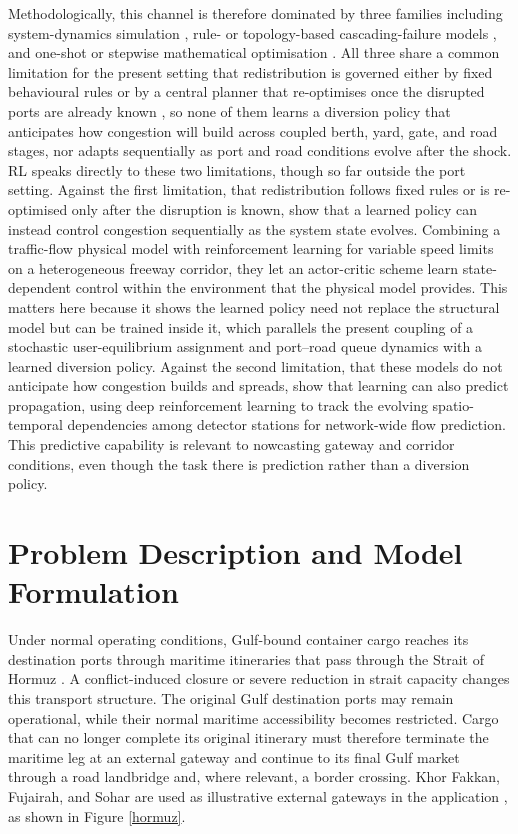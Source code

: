 \documentclass[a4paper,fleqn]{cas-sc}
\begin{document}
Methodologically, this channel is therefore dominated by three families including system-dynamics simulation \citep{BellEtAl2023}, rule- or topology-based cascading-failure models \citep{XuEtAl2022,XuEtAl2025,LuEtAl2024}, and one-shot or stepwise mathematical optimisation \citep{CaoEtAl2025}. All three share a common limitation for the present setting that redistribution is governed either by fixed behavioural rules \citep{XuEtAl2022,XuEtAl2025} or by a central planner that re-optimises once the disrupted ports are already known \citep{LuEtAl2024,CaoEtAl2025}, so none of them learns a diversion policy that anticipates how congestion will build across coupled berth, yard, gate, and road stages, nor adapts sequentially as port and road conditions evolve after the shock. RL speaks directly to these two limitations, though so far outside the port setting. Against the first limitation, that redistribution follows fixed rules or is re-optimised only after the disruption is known, \citet{yang2026optimal} show that a learned policy can instead control congestion sequentially as the system state evolves. Combining a traffic-flow physical model with reinforcement learning for variable speed limits on a heterogeneous freeway corridor, they let an actor-critic scheme learn state-dependent control within the environment that the physical model provides. This matters here because it shows the learned policy need not replace the structural model but can be trained inside it, which parallels the present coupling of a stochastic user-equilibrium assignment and port--road queue dynamics with a learned diversion policy. Against the second limitation, that these models do not anticipate how congestion builds and spreads, \citet{chen2022novel} show that learning can also predict propagation, using deep reinforcement learning to track the evolving spatio-temporal dependencies among detector stations for network-wide flow prediction. This predictive capability is relevant to nowcasting gateway and corridor conditions, even though the task there is prediction rather than a diversion policy.


\section{Problem Description and Model Formulation}
\label{sec:model}

Under normal operating conditions, Gulf-bound container cargo reaches its
destination ports through maritime itineraries that pass through the Strait
of Hormuz \citep{saidi2026logistical}. A conflict-induced closure or severe reduction in strait capacity
changes this transport structure. The original Gulf destination ports may
remain operational, while their normal maritime accessibility becomes
restricted. Cargo that can no longer complete its original itinerary must
therefore terminate the maritime leg at an external gateway and continue to
its final Gulf market through a road landbridge and, where relevant, a border
crossing. Khor Fakkan, Fujairah, and Sohar are used as illustrative external
gateways in the application \citep{elsafty2026hormuz}, as shown in Figure \ref{hormuz}.
\end{document}
